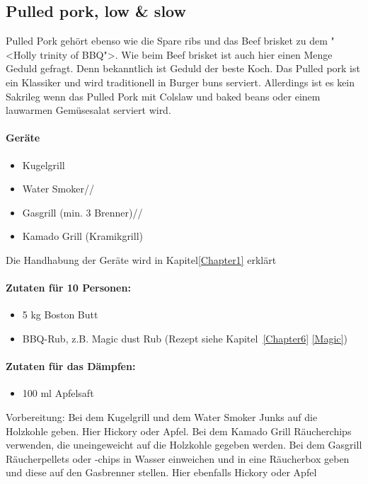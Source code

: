 \subsection{Pulled pork, low \& slow}
Pulled Pork gehört ebenso wie die Spare ribs und das Beef brisket zu 
dem "<Holly trinity of BBQ">. Wie beim Beef brisket ist auch hier einen 
Menge Geduld gefragt. Denn bekanntlich ist Geduld der beste Koch. Das 
Pulled pork ist ein Klassiker und wird traditionell in Burger buns serviert. Allerdings ist 
es kein Sakrileg wenn das Pulled Pork mit Colslaw und baked beans oder 
einem lauwarmen Gemüsesalat serviert wird.

\paragraph{Geräte}

\begin{itemize}[noitemsep]
	\item Kugelgrill
	\item Water Smoker//
 	\item Gasgrill (min. 3 Brenner)//
	\item Kamado Grill (Kramikgrill)
\end{itemize}

Die Handhabung der Geräte wird in Kapitel\ref{Chapter1} erklärt

\paragraph{Zutaten für 10 Personen:}

\begin{itemize}[noitemsep]
	\item 5 kg Boston Butt
	\item BBQ-Rub, z.B. Magic dust Rub (Rezept siehe 
	Kapitel~\ref{Chapter6} \vref{Magic})
\end{itemize}

\paragraph{Zutaten für das Dämpfen:}

\begin{itemize}[noitemsep]
	\item 100 ml Apfelsaft
\end{itemize}

Vorbereitung: Bei dem Kugelgrill und dem Water Smoker Junks auf die Holzkohle geben. Hier 
Hickory oder Apfel.
Bei dem Kamado Grill Räucherchips verwenden, die uneingeweicht auf die Holzkohle gegeben 
werden.
Bei dem Gasgrill Räucherpellets oder -chips in Wasser einweichen und in 
eine Räucherbox geben und diese auf den Gasbrenner stellen. Hier 
ebenfalls Hickory oder Apfel

